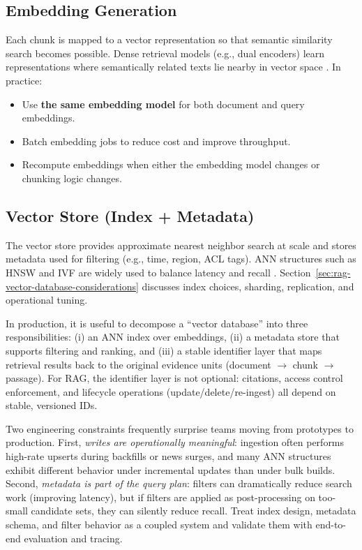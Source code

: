 \subsection{Embedding Generation}
Each chunk is mapped to a vector representation so that semantic similarity search becomes possible. Dense retrieval models (e.g., dual encoders) learn representations where semantically related texts lie nearby in vector space \cite{Karpukhin2020DPR}. In practice:
\begin{itemize}
    \item Use \textbf{the same embedding model} for both document and query embeddings.
    \item Batch embedding jobs to reduce cost and improve throughput.
    \item Recompute embeddings when either the embedding model changes or chunking logic changes.
\end{itemize}

\subsection{Vector Store (Index + Metadata)}
The vector store provides approximate nearest neighbor search at scale and stores metadata used for filtering (e.g., time, region, ACL tags). ANN structures such as HNSW and IVF are widely used to balance latency and recall \cite{Johnson2019FAISS,Malkov2018HNSW,Jegou2011PQ}. Section~\ref{sec:rag-vector-database-considerations} discusses index choices, sharding, replication, and operational tuning.

In production, it is useful to decompose a ``vector database'' into three responsibilities:
(i) an ANN index over embeddings, (ii) a metadata store that supports filtering and ranking, and (iii) a stable identifier layer that maps retrieval results back to the original evidence units (document $\rightarrow$ chunk $\rightarrow$ passage). For RAG, the identifier layer is not optional: citations, access control enforcement, and lifecycle operations (update/delete/re-ingest) all depend on stable, versioned IDs.

Two engineering constraints frequently surprise teams moving from prototypes to production. First, \emph{writes are operationally meaningful}: ingestion often performs high-rate upserts during backfills or news surges, and many ANN structures exhibit different behavior under incremental updates than under bulk builds. Second, \emph{metadata is part of the query plan}: filters can dramatically reduce search work (improving latency), but if filters are applied as post-processing on too-small candidate sets, they can silently reduce recall. Treat index design, metadata schema, and filter behavior as a coupled system and validate them with end-to-end evaluation and tracing.

